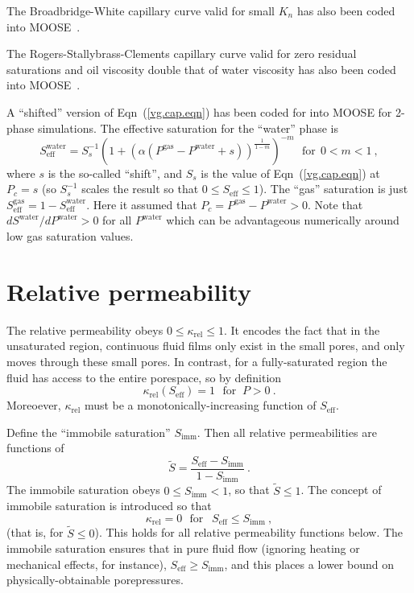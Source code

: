 \documentclass[]{scrreprt}
\begin{document}
The Broadbridge-White capillary curve valid for small $K_{n}$ has also been coded into MOOSE~\cite{bw1988}.

The Rogers-Stallybrass-Clements capillary curve valid for zero
residual saturations and oil viscosity double that of water viscosity
has also been coded into MOOSE~\cite{rsc1983}. 

A ``shifted'' version of Eqn~(\ref{vg.cap.eqn}) has been coded for
into MOOSE for 2-phase simulations.  The effective saturation for the
``water'' phase is
\begin{equation}
S^{\mathrm{water}}_{\mathrm{eff}} = S_{s}^{-1}\left( 1 + (\alpha
  (P^{\mathrm{gas}} - P^{\mathrm{water}} + s))^{\frac{1}{1 - m}}
\right)^{-m} \ \ \ \mbox{for}\ \ 0<m<1 \ ,
\end{equation}
where $s$ is the so-called ``shift'', and $S_{s}$ is the value of
Eqn~(\ref{vg.cap.eqn}) at $P_{c}=s$ (so $S_{s}^{-1}$ scales the result so
that $0\leq S_{\mathrm{eff}}\leq 1$).  The ``gas'' saturation is just
$S^{\mathrm{gas}}_{\mathrm{eff}}=1-S^{\mathrm{water}}_{\mathrm{eff}}$.
Here it assumed that $P_{c} = P^{\mathrm{gas}}-P^{\mathrm{water}}>0$.
Note that $dS^{\mathrm{water}}/dP^{\mathrm{water}} >0$ for all
$P^{\mathrm{water}}$ which can be advantageous numerically around low
gas saturation values.


\section{Relative permeability}
\label{rel.perm.sec}

The relative permeability obeys $0\leq \kappa_{\mathrm{rel}} \leq 1$.
It encodes the fact that in the unsaturated region, continuous fluid
films only exist in the small pores, and only moves through these
small pores.  In contrast, for a fully-saturated region the fluid has
access to the entire porespace, so by definition
\begin{equation}
\kappa_{\mathrm{rel}}(S_{\mathrm{eff}}) = 1 \ \ \ \mbox{for }\  P>0
\ .
\label{full.sat.rel.perm.eqn}
\end{equation}
Moreoever, $\kappa_{\mathrm{rel}}$ must be a monotonically-increasing
function of $S_{\mathrm{eff}}$.

Define the ``immobile saturation'' $S_{\mathrm{imm}}$.  Then all
relative permeabilities are functions of
\begin{equation}
\tilde{S} = \frac{S_{\mathrm{eff}} -
  S_{\mathrm{imm}}}{1 - S_{\mathrm{imm}}} \ .
\end{equation}
The immobile saturation obeys $0\leq S_{\mathrm{imm}} < 1$, so that
$\tilde{S} \leq 1$.  The concept of immobile saturation
is introduced so that
\begin{equation}
\kappa_{\mathrm{rel}} = 0 \ \ \ \mbox{for }\ \ S_{\mathrm{eff}} \leq
S_{\mathrm{imm}} \ ,
\end{equation}
(that is, for $\tilde{S}\leq 0$).
This holds for all relative permeability functions below.  The
immobile saturation ensures that in pure fluid flow (ignoring heating
or mechanical effects, for instance), $S_{\mathrm{eff}}\geq
S_{\mathrm{imm}}$, and this places a lower bound on
physically-obtainable porepressures.
\end{document}
